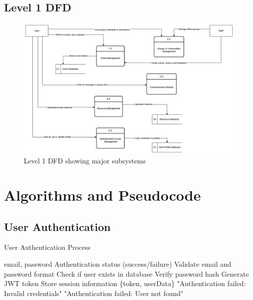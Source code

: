 \subsection{Level 1 DFD}
\begin{figure}[H]
    \centering
    \includegraphics[width=\textwidth]{images/dfd_level1.png}
    \caption{Level 1 DFD showing major subsystems}
    \label{fig:dfd1}
\end{figure}


\vspace{3cm}

\section{Algorithms and Pseudocode}
\label{sec:algorithms}

\subsection{User Authentication}
\begin{algorithm}[H]
\caption{User Authentication Process}\label{alg:auth}
\begin{algorithmic}[1]
\Require email, password
\Ensure Authentication status (success/failure)
\State Validate email and password format
\State Check if user exists in database
    \State Verify password hash
        \State Generate JWT token
        \State Store session information
        \State \Return \{token, userData\}
    \Else
        \State \Return "Authentication failed: Invalid credentials"
    \EndIf
\Else
    \State \Return "Authentication failed: User not found"
\EndIf
\end{algorithmic}
\end{algorithm}

